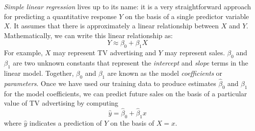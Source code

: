 \textit{Simple linear regression} lives up to its name: it is a very straightforward approach for predicting a quantitative response $Y$ on the basis of a single predictor variable $X$. It assumes that there is approximately a linear relationship between $X$ and $Y$. Mathematically, we can write this linear relationship as:
\[Y \approx \beta_0 + \beta_1 X\]
For example, $X$ may represent TV advertising and $Y$ may represent sales. $\beta_0$ and $\beta_1$ are two unknown constants that represent
the \textit{intercept} and \textit{slope} terms in the linear model. Together, $\beta_0$ and $\beta_1$ are known as the model \textit{coefficients} or \textit{parameters}. Once we have used our training data to produce estimates $\hat{\beta}_0$ and $\hat{\beta}_1$ for the model coefficients, we can predict future sales on the basis of a particular value of TV advertising by computing
\[\hat{y} = \hat{\beta}_0 + \hat{\beta}_1 x\]
where $\hat{y}$ indicates a prediction of $Y$ on the basis of $X = x$.

